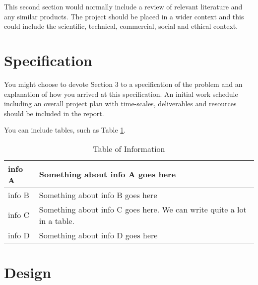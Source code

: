 \documentclass[twocolumn]{article}
\begin{document}
This second section would normally include a review of relevant literature and any similar products. The project should be placed in a wider context and this could include the scientific, technical, commercial, social and ethical context.


\section{Specification}
\vspace{-1ex}

You might choose to devote Section 3 to a specification of the problem and an explanation of how you arrived at this specification. An initial work schedule including an overall project plan with time-scales, deliverables and resources should be included in the report.

You can include tables, such as Table \ref{tbl:info}.




\begin{table}%
\centering
\caption{Table of Information}
\vspace{1em}	%
\label{tbl:info}
\begin{tabular}{|l|p{}|}
\hline
info A & Something about info A goes here                                       \\ \hline
info B & Something about info B goes here                                       \\ \hline
info C & Something about info C goes here. We can write quite a lot in a table. \\ \hline
info D & Something about info D goes here                                       \\ \hline
\end{tabular}
\end{table}


\section{Design}
\vspace{-1ex}
\end{document}
